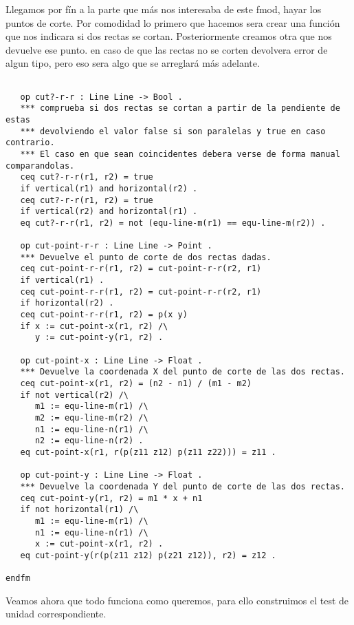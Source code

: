 Llegamos por f\'in a la parte que m\'as nos interesaba de este fmod, hayar los puntos de corte.
Por comodidad lo primero que hacemos sera crear una funci\'on que nos indicara si dos rectas se cortan.
Posteriormente creamos otra que nos devuelve ese punto. en caso de que las rectas no se corten devolvera error de algun tipo, pero eso sera algo que se arreglar\'a m\'as adelante. 

\begin{verbatim}	

   op cut?-r-r : Line Line -> Bool .
   *** comprueba si dos rectas se cortan a partir de la pendiente de estas
   *** devolviendo el valor false si son paralelas y true en caso contrario.
   *** El caso en que sean coincidentes debera verse de forma manual comparandolas.
   ceq cut?-r-r(r1, r2) = true 
   if vertical(r1) and horizontal(r2) .
   ceq cut?-r-r(r1, r2) = true 
   if vertical(r2) and horizontal(r1) .
   eq cut?-r-r(r1, r2) = not (equ-line-m(r1) == equ-line-m(r2)) .

   op cut-point-r-r : Line Line -> Point .
   *** Devuelve el punto de corte de dos rectas dadas.
   ceq cut-point-r-r(r1, r2) = cut-point-r-r(r2, r1)
   if vertical(r1) .
   ceq cut-point-r-r(r1, r2) = cut-point-r-r(r2, r1)
   if horizontal(r2) .
   ceq cut-point-r-r(r1, r2) = p(x y)
   if x := cut-point-x(r1, r2) /\
      y := cut-point-y(r1, r2) .

   op cut-point-x : Line Line -> Float .
   *** Devuelve la coordenada X del punto de corte de las dos rectas.
   ceq cut-point-x(r1, r2) = (n2 - n1) / (m1 - m2)
   if not vertical(r2) /\
      m1 := equ-line-m(r1) /\
      m2 := equ-line-m(r2) /\
      n1 := equ-line-n(r1) /\
      n2 := equ-line-n(r2) .
   eq cut-point-x(r1, r(p(z11 z12) p(z11 z22))) = z11 .
	
   op cut-point-y : Line Line -> Float .
   *** Devuelve la coordenada Y del punto de corte de las dos rectas.
   ceq cut-point-y(r1, r2) = m1 * x + n1
   if not horizontal(r1) /\
      m1 := equ-line-m(r1) /\
      n1 := equ-line-n(r1) /\
      x := cut-point-x(r1, r2) .
   eq cut-point-y(r(p(z11 z12) p(z21 z12)), r2) = z12 .

endfm

\end{verbatim}

Veamos ahora que todo funciona como queremos, para ello construimos el test de unidad correspondiente.


